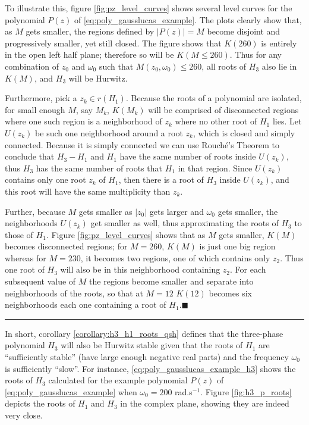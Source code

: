 	To illustrate this, figure \ref{fig:pz_level_curves} shows several level curves for the polynomial $P(z)$ of \eqref{eq:poly_gausslucas_example}. The plots clearly show that, as $M$ gets smaller, the regions defined by $\left\lvert P(z)\right\rvert = M$ become disjoint and progressively smaller, yet still closed. The figure shows that $K(260)$ is entirely in the open left half plane; therefore so will be $K(M\leq 260)$. Thus for any combination of $z_0$ and $\omega_0$ such that $M\left(z_0,\omega_0\right) \leq 260$, all roots of $H_3$ also lie in $K(M)$, and $H_3$ will be Hurwitz.

	Furthermore, pick a $z_k\in r\left(H_1\right)$. Because the roots of a polynomial are isolated, for small enough $M$, say $M_k$, $K\left(M_k\right)$ will be comprised of disconnected regions where one such region is a neighborhood of $z_k$ where no other root of $H_1$ lies. Let $U\left(z_k\right)$ be such one neighborhood around a root $z_k$, which is closed and simply connected. Because it is simply connected we can use Rouché's Theorem to conclude that $H_3 - H_1$ and $H_1$ have the same number of roots inside $U\left(z_k\right)$, thus $H_3$ has the same number of roots that $H_1$ in that region. Since $U\left(z_k\right)$ contains only one root $z_k$ of $H_1$, then there is a root of $H_3$ inside $U\left(z_k\right)$, and this root will have the same multiplicity than $z_k$.

	Further, because $M$ gets smaller as $\left\lvert z_0\right\rvert$ gets larger and $\omega_0$ gets smaller, the neighborhoods $U\left(z_k\right)$ get smaller as well, thus approximating the roots of $H_3$ to those of $H_1$. Figure \ref{fig:pz_level_curves} shows that as $M$ gets smaller, $K(M)$ becomes disconnected regions; for $M=260$, $K(M)$ is just one big region whereas for $M=230$, it becomes two regions, one of which contains only $z_2$. Thus one root of $H_3$ will also be in this neighborhood containing $z_2$. For each subsequent value of $M$ the regions become smaller and separate into neighborhoods of the roots, so that at $M=12$ $K(12)$ becomes six neighborhoods each one containing a root of $H_1$.\hfill$\blacksquare$ \vspace{3mm}\hrule\vspace{3mm} %

	In short, corollary \ref{corollary:h3_h1_roots_qsh} defines that the three-phase polynomial $H_3$ will also be Hurwitz stable given that the roots of $H_1$ are ``sufficiently stable'' (have large enough negative real parts) and the frequency $\omega_0$ is sufficiently ``slow''. For instance, \eqref{eq:poly_gausslucas_example_h3} shows the roots of $H_3$ calculated for the example polynomial $P(z)$ of \eqref{eq:poly_gausslucas_example} when $\omega_0 = 200$ rad.s$^{-1}$. Figure \ref{fig:h3_p_roots} depicts the roots of $H_1$ and $H_3$ in the complex plane, showing they are indeed very close.

